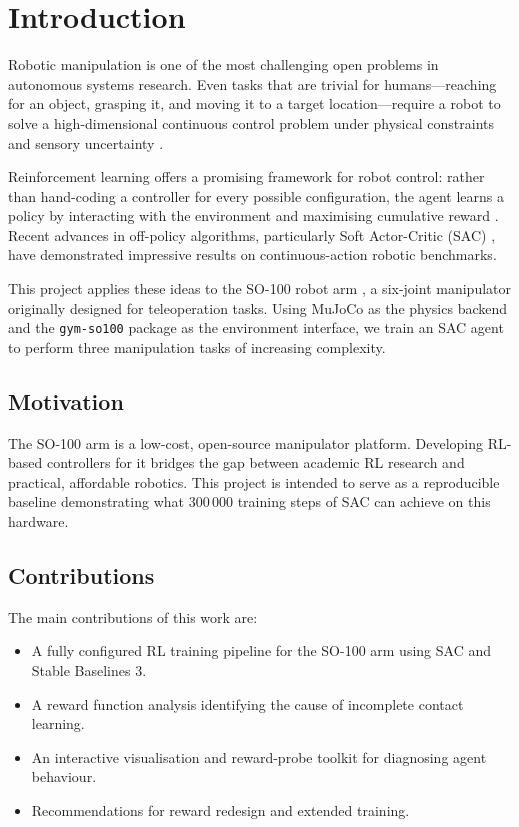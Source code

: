\documentclass[conference]{IEEEtran}
\begin{document}
\section{Introduction}
\label{sec:introduction}

Robotic manipulation is one of the most challenging open problems in
autonomous systems research.
Even tasks that are trivial for humans—reaching for an object,
grasping it, and moving it to a target location—require a robot to
solve a high-dimensional continuous control problem under physical
constraints and sensory uncertainty \cite{todorov2012mujoco}.

Reinforcement learning offers a promising framework for robot
control: rather than hand-coding a controller for every possible
configuration, the agent learns a policy by interacting with the
environment and maximising cumulative reward \cite{sutton2018rl}.
Recent advances in off-policy algorithms, particularly
Soft Actor-Critic (SAC) \cite{haarnoja2018sac}, have demonstrated
impressive results on continuous-action robotic benchmarks.

This project applies these ideas to the SO-100 robot arm
\cite{gymso100}, a six-joint manipulator originally designed for
teleoperation tasks.
Using MuJoCo as the physics backend and the \texttt{gym-so100}
package as the environment interface, we train an SAC agent to
perform three manipulation tasks of increasing complexity.

\subsection{Motivation}

The SO-100 arm is a low-cost, open-source manipulator platform.
Developing RL-based controllers for it bridges the gap between
academic RL research and practical, affordable robotics.
This project is intended to serve as a reproducible baseline
demonstrating what 300\,000 training steps of SAC can achieve on
this hardware.

\subsection{Contributions}

The main contributions of this work are:
\begin{itemize}
    \item A fully configured RL training pipeline for the SO-100
          arm using SAC and Stable Baselines 3.
    \item A reward function analysis identifying the cause of
          incomplete contact learning.
    \item An interactive visualisation and reward-probe toolkit
          for diagnosing agent behaviour.
    \item Recommendations for reward redesign and extended training.
\end{itemize}
\end{document}
